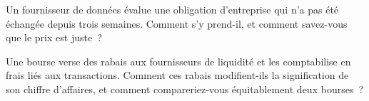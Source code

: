 \begin{interviewq}\label{iq:in:exchanges-brokers-vendors-and-regulators-as-employers:5}
Un fournisseur de données évalue une obligation d'entreprise qui n'a pas été échangée depuis trois semaines. Comment s'y prend-il, et comment savez-vous que le prix est juste~?
\end{interviewq}

\begin{interviewq}\label{iq:in:exchanges-brokers-vendors-and-regulators-as-employers:6}
Une bourse verse des rabais aux fournisseurs de liquidité et les comptabilise en frais liés aux transactions. Comment ces rabais modifient-ils la
signification de son chiffre d'affaires, et comment compareriez-vous équitablement deux bourses~?
\end{interviewq}
